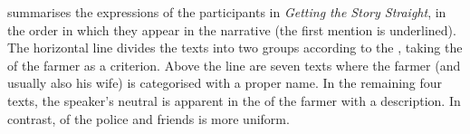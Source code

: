 \documentclass[output=paper
,modfonts
,nonflat]{langsci/langscibook}
\begin{document}
\noindent
{} summarises the expressions of the participants in \emph{Getting the Story Straight}, in the order in which they appear in the narrative (the first mention is underlined). The horizontal line divides the texts into two groups according to the , taking the  of the farmer as a criterion. Above the line are seven texts where the farmer (and usually also his wife) is categorised with a proper name. In the remaining four texts, the speaker's neutral  is apparent in the  of the farmer with a description. In contrast,  of the police and friends is more uniform.

 
\end{document}
